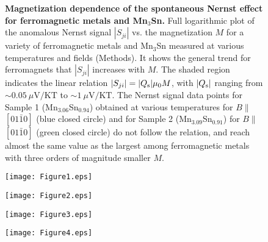 \documentclass[amsmath,amssymb]{nature}
\begin{document}
\begin{figure}

\caption {\label{RT} {\bf Magnetization dependence of the spontaneous Nernst effect for ferromagnetic metals and Mn$_3$Sn.} Full logarithmic plot of the anomalous Nernst signal $|S_{ji}|$ vs. the magnetization $M$ for a variety of ferromagnetic metals and Mn$_3$Sn measured at various temperatures and fields (Methods). It shows the general trend for ferromagnets that $|S_{ji}|$ increases with $M$. The shaded region indicates the linear relation $|S_{ji}| = |Q_{\rm s}|\mu_0M$, with $|Q_{\rm s}|$ ranging from $\sim 0.05~\mu\mathrm{V}/\mathrm{KT}$ to $\sim 1~\mu\mathrm{V}/\mathrm{KT}$. The Nernst signal data points for Sample 1 (Mn$_{3.06}$Sn$_{0.94}$) obtained at various temperatures for $B \parallel $  $[01\bar{1}0]$  (blue closed circle) and for Sample 2 (Mn$_{3.09}$Sn$_{0.91}$)   for $B \parallel $  $[01\bar{1}0]$ (green closed circle) do not follow the relation, and reach almost the same value as the largest among ferromagnetic metals with three orders of magnitude smaller $M$.}

\end{figure}



	\pagebreak
	\begin{figure}
		\begin{center}
			\hspace{-1cm}
			\texttt{[image: Figure1.eps]}
		\end{center}
	\end{figure}
	
	
	\begin{figure}
		\begin{center}
			\hspace{-1cm}
			\texttt{[image: Figure2.eps]}
		\end{center}
	\end{figure}
	
	
	
	\begin{figure}
		\begin{center}
			\hspace{-1cm}
			\texttt{[image: Figure3.eps]}
		\end{center}
	\end{figure}
	
	
	
	\begin{figure}
		\begin{center}
			\hspace{-1cm}
			\texttt{[image: Figure4.eps]}
		\end{center}
	\end{figure}
	\newpage	
\end{document}
